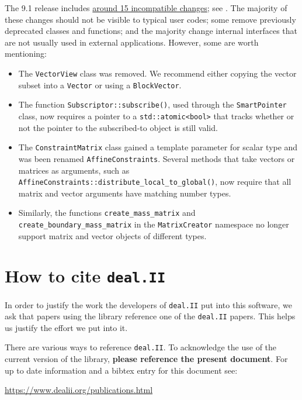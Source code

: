 \documentclass{ansarticle-preprint}
\newcommand{\specialword}[1]{\texttt{#1}}
\newcommand{\dealii}{{\specialword{deal.II}}\xspace}
\begin{document}
The 9.1 release includes
\href{https://dealii.org/developer/doxygen/deal.II/changes_between_9_0_1_and_9_1_0.html}
     {around 15 incompatible changes}; see \cite{changes91}. The majority of these changes
should not be visible to typical user codes; some remove previously
deprecated classes and functions; and the majority change internal
interfaces that are not usually used in external
applications. However, some are worth mentioning:
\begin{itemize}
\item The \texttt{VectorView} class was removed. We recommend either copying the
      vector subset into a \texttt{Vector} or using a \texttt{BlockVector}.
\item The function \texttt{Subscriptor::subscribe()}, used through the
  \texttt{SmartPointer} class, now requires a pointer to a
      \texttt{std::atomic<bool>} that tracks whether or not the pointer to the
      subscribed-to object is still valid.
\item The \texttt{ConstraintMatrix} class gained a template parameter for scalar
      type and was been renamed \texttt{AffineConstraints}. Several methods that
      take vectors or matrices as arguments,
      such as \texttt{AffineConstraints::distribute\_local\_to\_global()},
      now require that all matrix and vector arguments have matching number
      types.
\item Similarly, the functions \texttt{create\_mass\_matrix} and
      \texttt{create\_boundary\_mass\_matrix} in the \texttt{MatrixCreator}
      namespace no longer
      support matrix and vector objects of different types.
\end{itemize}



\section{How to cite \dealii}\label{sec:cite}

In order to justify the work the developers of \dealii put into this
software, we ask that papers using the library reference one of the
\dealii papers. This helps us justify the effort we put into it.

There are various ways to reference \dealii. To acknowledge the use of
the current version of the library, \textbf{please reference the present
document}. For up to date information and a bibtex entry for this document
see:
\begin{center}
 \url{https://www.dealii.org/publications.html}
\end{center}
\end{document}
